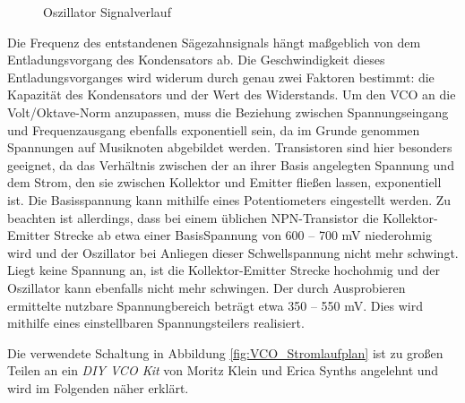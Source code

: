 \begin{figure}[h]
	\centering
	\setlength{\fboxsep}{1pt} %
	\setlength{\fboxrule}{1pt} %
	\caption{Oszillator Signalverlauf}
	\label{fig:Oszillator_Signalverlauf}
\end{figure}

\newpage

Die Frequenz des entstandenen Sägezahnsignals hängt maßgeblich von dem Entladungsvorgang des Kondensators ab.
Die Geschwindigkeit dieses Entladungsvorganges wird widerum durch genau zwei Faktoren bestimmt: die Kapazität des Kondensators und der Wert des Widerstands.
Um den VCO an die Volt/Oktave-Norm anzupassen, muss die Beziehung zwischen Spannungseingang und Frequenzausgang ebenfalls exponentiell sein, da im Grunde genommen Spannungen auf Musiknoten abgebildet werden. 
Transistoren sind hier besonders geeignet, da das Verhältnis zwischen der an ihrer Basis angelegten Spannung und dem Strom, den sie zwischen Kollektor und Emitter fließen lassen, exponentiell ist.
Die Basisspannung kann mithilfe eines Potentiometers eingestellt werden.
Zu beachten ist allerdings, dass bei einem üblichen NPN-Transistor die Kollektor-Emitter Strecke ab etwa einer BasisSpannung von 600 -- 700 mV niederohmig wird und der Oszillator bei Anliegen dieser Schwellspannung nicht mehr schwingt. 
Liegt keine Spannung an, ist die Kollektor-Emitter Strecke hochohmig und der Oszillator kann ebenfalls nicht mehr schwingen.
Der durch Ausprobieren ermittelte nutzbare Spannungbereich beträgt etwa 350 -- 550 mV.
Dies wird mithilfe eines einstellbaren Spannungsteilers realisiert. 

Die verwendete Schaltung 
in Abbildung \ref{fig:VCO_Stromlaufplan} 
ist zu großen Teilen an ein \textit{DIY VCO Kit} von Moritz Klein und Erica Synths angelehnt und wird im Folgenden näher erklärt. \cite{klein_vco}



